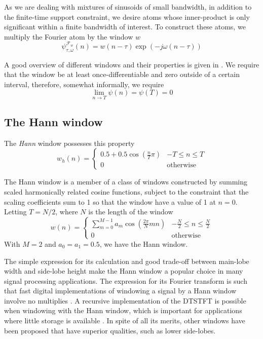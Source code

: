 As we are dealing with mixtures of sinusoids of small bandwidth, in addition to
the finite-time support constraint, we desire atoms whose inner-product is only
significant within a finite bandwidth of interest. To construct these atoms, we
multiply the Fourier atom by the window $w$
\[
    \psi_{\tau,\omega}^{\mathcal{F}_{w}}(n) = w(n-\tau) \exp(-j\omega(n-\tau))
\]

A good overview of different windows and their properties is given in
\cite{harris1978use}. We require that the window be at least
once-differentiable and zero outside of a certain interval, therefore, somewhat
informally, we require
\[
    \lim_{n \rightarrow T} \psi(n) = \psi(T) = 0
\]

\subsection{The Hann window}

The \textit{Hann} window possesses this property
\[
    w_{h}(n) = \begin{cases}
        0.5 + 0.5 \cos \left( \frac{n}{T}\pi \right) & -T \leq n \leq T \\
        0 & \text{otherwise}
    \end{cases}
\]

The Hann window is a member of a class of windows constructed by summing scaled
harmonically related cosine functions, subject to the constraint that the
scaling coefficients sum to 1 so that the window have a value of 1 at $n=0$.
Letting $T=N/2$, where $N$ is the length of the window
\[
    w(n) = \begin{cases}
        \sum_{m=0}^{M-1}a_{m}\cos \left( \frac{2\pi}{N}mn \right) & -\frac{N}{2} \leq n
        \leq \frac{N}{2} \\
        0 & \text{otherwise}
    \end{cases}
\]
With $M=2$ and $a_0 = a_1 = 0.5$, we have the Hann window.

The simple expression for its calculation and good trade-off between main-lobe
width and side-lobe height make the Hann window a popular choice in many signal
processing applications. The expression for its Fourier transform is such that
fast digital implementations of windowing a signal by a Hann window involve no
multiplies \cite[p.~183]{harris1978use}. A recursive implementation of the
DTSTFT is possible when windowing with the Hann window, which is important for
applications where little storage is available \cite[p.~102]{stankovic2014time}.
In spite of all its merits, other windows have been proposed that have superior
qualities, such as lower side-lobes.

